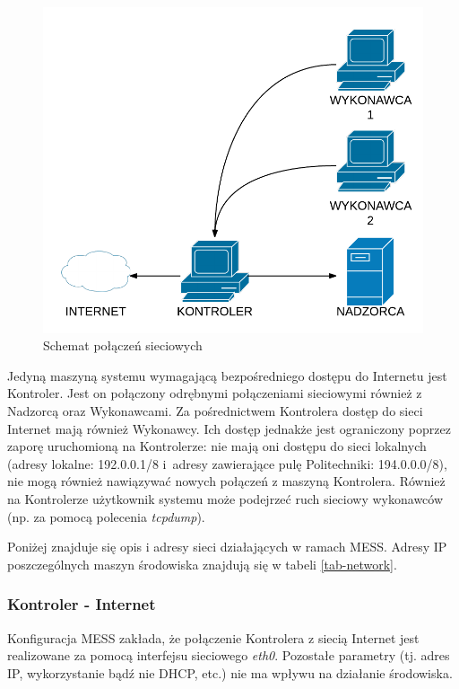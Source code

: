 \documentclass[a4paper,12pt,oneside]{article}
\begin{document}
	\begin{figure}[th]
		\includegraphics[scale=1.0]{gfx/schema-network.png}
		\caption{Schemat połączeń sieciowych}
		\label{gfx-schema-network}
	\end{figure}
	
	Jedyną maszyną systemu wymagającą bezpośredniego dostępu do Internetu jest Kontroler. Jest on połączony odrębnymi połączeniami sieciowymi również z Nadzorcą oraz Wykonawcami. Za pośrednictwem Kontrolera dostęp do sieci Internet mają również Wykonawcy. Ich dostęp jednakże jest ograniczony poprzez zaporę uruchomioną na Kontrolerze: nie mają oni dostępu do sieci lokalnych (adresy lokalne: 192.0.0.1/8 i~adresy zawierające pulę Politechniki: 194.0.0.0/8), nie mogą również nawiązywać nowych połączeń z maszyną Kontrolera. Również na Kontrolerze użytkownik systemu może podejrzeć ruch sieciowy wykonawców (np. za pomocą polecenia \textit{tcpdump}).
	
	Poniżej znajduje się opis i adresy sieci działających w ramach MESS. Adresy IP poszczególnych maszyn środowiska znajdują się w tabeli \ref{tab-network}.
	
	\subsubsection{Kontroler - Internet}
	
	Konfiguracja MESS zakłada, że połączenie Kontrolera z siecią Internet jest realizowane za pomocą interfejsu sieciowego \textit{eth0}. Pozostałe parametry (tj. adres IP, wykorzystanie bądź nie DHCP, etc.) nie ma wpływu na działanie środowiska.
	
\end{document}
